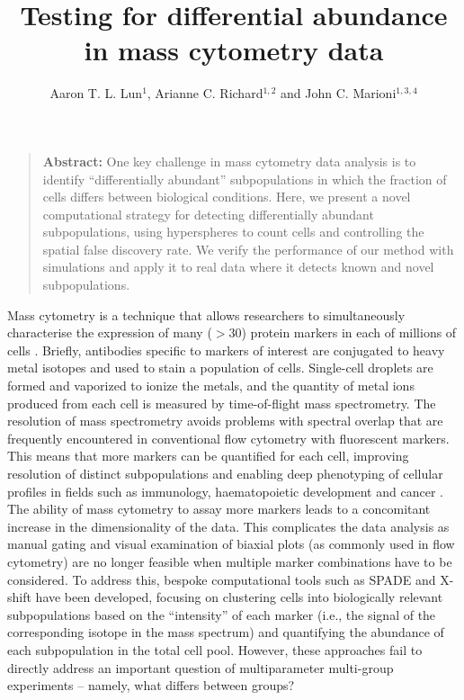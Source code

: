 \documentclass{article}
\title{Testing for differential abundance in mass cytometry data}
\author{Aaron T. L. Lun$^{1}$, Arianne C. Richard$^{1,2}$ and John C. Marioni$^{1,3,4}$}
\date{
\begin{minipage}{0.9\textwidth}
\begin{flushleft} 
\begin{small}
$^1$Cancer Research UK Cambridge Institute, University of Cambridge, Li Ka Shing Centre, Robinson Way, Cambridge CB2 0RE, United Kingdom \\
$^2$Cambridge Institute for Medical Research,  University of Cambridge, Wellcome Trust/MRC Building, Hills Road, Cambridge CB2 0XY, United Kingdom \\
$^3$EMBL European Bioinformatics Institute, Wellcome Genome Campus, Hinxton, Cambridge CB10 1SD, United Kingdom \\
$^4$Wellcome Trust Sanger Institute, Wellcome Genome Campus, Hinxton, Cambridge CB10 1SA, United Kingdom \\
\end{small}
\end{flushleft}
\end{minipage}\\[0.2in]
\today{}
}
\begin{document}
\maketitle

\begin{quote}
\textbf{Abstract:} 
One key challenge in mass cytometry data analysis is to identify ``differentially abundant'' subpopulations in which the fraction of cells differs between biological conditions. 
Here, we present a novel computational strategy for detecting differentially abundant subpopulations, using hyperspheres to count cells and controlling the spatial false discovery rate.
We verify the performance of our method with simulations and apply it to real data where it detects known and novel subpopulations.
\end{quote}

\noindent
Mass cytometry is a technique that allows researchers to simultaneously characterise the expression of many ($>30$) protein markers in each of millions of cells \cite{ornatsky2008study}.
Briefly, antibodies specific to markers of interest are conjugated to heavy metal isotopes and used to stain a population of cells.
Single-cell droplets are formed and vaporized to ionize the metals, and the quantity of metal ions produced from each cell is measured by time-of-flight mass spectrometry.
The resolution of mass spectrometry avoids problems with spectral overlap that are frequently encountered in conventional flow cytometry with fluorescent markers.
This means that more markers can be quantified for each cell, improving resolution of distinct subpopulations and enabling deep phenotyping of cellular profiles in fields such as immunology, haematopoietic development and cancer \cite{leipold2015multiparameter,leelatian2015characterizing,hansmann2015mass,bendall2011singlecell,levine2015datadriven}.
The ability of mass cytometry to assay more markers leads to a concomitant increase in the dimensionality of the data.
This complicates the data analysis as manual gating and visual examination of biaxial plots (as commonly used in flow cytometry) are no longer feasible when multiple marker combinations have to be considered.
To address this, bespoke computational tools such as SPADE \cite{qiu2011extracting} and X-shift \cite{samusik2016automated} have been developed, focusing on clustering cells into biologically relevant subpopulations based on the ``intensity'' of each marker (i.e., the signal of the corresponding isotope in the mass spectrum) and quantifying the abundance of each subpopulation in the total cell pool.
However, these approaches fail to directly address an important question of multiparameter multi-group experiments -- namely, what differs between groups?
\end{document}
